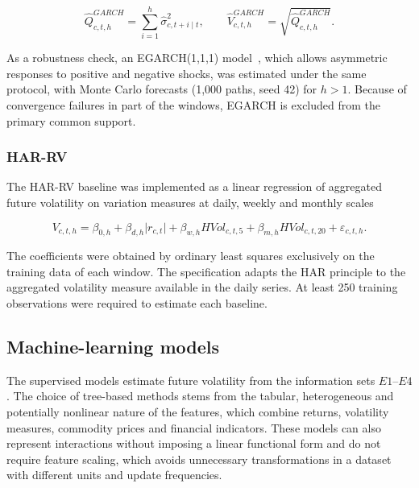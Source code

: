 \documentclass[a4paper,fleqn]{cas-sc}
\begin{document}
\begin{equation}
\widehat{Q}^{GARCH}_{c,t,h}
=
\sum_{i=1}^{h}\widehat{\sigma}_{c,t+i\mid t}^{2},
\qquad
\widehat{V}^{GARCH}_{c,t,h}
=
\sqrt{\widehat{Q}^{GARCH}_{c,t,h}}.
\label{eq:garch_forecast}
\end{equation}

As a robustness check, an EGARCH(1,1,1) model~\citep{Nelson1991EGARCH}, which allows asymmetric responses to positive and negative shocks, was estimated under the same protocol, with Monte Carlo forecasts (1,000 paths, seed 42) for \(h>1\). Because of convergence failures in part of the windows, EGARCH is excluded from the primary common support.

\subsubsection{HAR-RV}

The HAR-RV baseline was implemented as a linear regression of aggregated future volatility on variation measures at daily, weekly and monthly scales \citep{Corsi2009HAR}

\begin{equation}
V_{c,t,h}
=
\beta_{0,h}
+\beta_{d,h}\lvert r_{c,t}\rvert
+\beta_{w,h}HVol_{c,t,5}
+\beta_{m,h}HVol_{c,t,20}
+\varepsilon_{c,t,h}.
\label{eq:har}
\end{equation}

The coefficients were obtained by ordinary least squares exclusively on the training data of each window. The specification adapts the HAR principle to the aggregated volatility measure available in the daily series. At least 250 training observations were required to estimate each baseline.

\subsection{Machine-learning models}
\label{subsec:ml_models}

The supervised models estimate future volatility from the information sets \(E1\)--\(E4\). The choice of tree-based methods stems from the tabular, heterogeneous and potentially nonlinear nature of the features, which combine returns, volatility measures, commodity prices and financial indicators. These models can also represent interactions without imposing a linear functional form and do not require feature scaling, which avoids unnecessary transformations in a dataset with different units and update frequencies.
\end{document}
